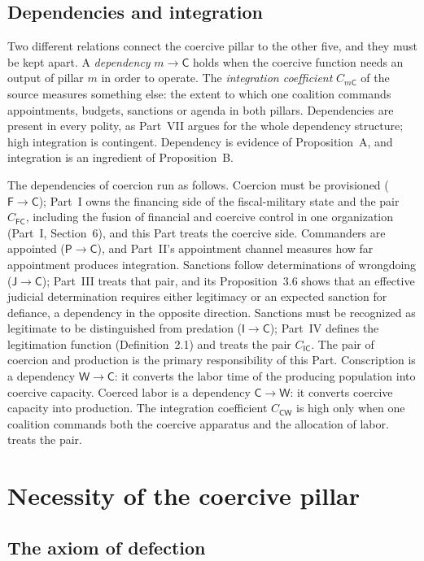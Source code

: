 \documentclass[11pt,letterpaper]{article}
\theoremstyle{definition}
\theoremstyle{remark}
\newcommand{\pF}{\mathsf{F}}
\newcommand{\pP}{\mathsf{P}}
\newcommand{\pJ}{\mathsf{J}}
\newcommand{\pI}{\mathsf{I}}
\newcommand{\pC}{\mathsf{C}}
\newcommand{\pW}{\mathsf{W}}
\begin{document}
\subsection{Dependencies and integration}
\label{sec:depint}

Two different relations connect the coercive pillar to the other five, and they must be kept apart. A \emph{dependency} $m \to \pC$ holds when the coercive function needs an output of pillar $m$ in order to operate. The \emph{integration coefficient} $C_{m\pC}$ of the source measures something else: the extent to which one coalition commands appointments, budgets, sanctions or agenda in both pillars. Dependencies are present in every polity, as Part~VII argues for the whole dependency structure; high integration is contingent. Dependency is evidence of Proposition~A, and integration is an ingredient of Proposition~B.

The dependencies of coercion run as follows. Coercion must be provisioned ($\pF \to \pC$); Part~I owns the financing side of the fiscal-military state and the pair $C_{\pF\pC}$, including the fusion of financial and coercive control in one organization (Part~I, Section~6), and this Part treats the coercive side. Commanders are appointed ($\pP \to \pC$), and Part~II's appointment channel measures how far appointment produces integration. Sanctions follow determinations of wrongdoing ($\pJ \to \pC$); Part~III treats that pair, and its Proposition~3.6 shows that an effective judicial determination requires either legitimacy or an expected sanction for defiance, a dependency in the opposite direction. Sanctions must be recognized as legitimate to be distinguished from predation ($\pI \to \pC$); Part~IV defines the legitimation function (Definition~2.1) and treats the pair $C_{\pI\pC}$. The pair of coercion and production is the primary responsibility of this Part. Conscription is a dependency $\pW \to \pC$: it converts the labor time of the producing population into coercive capacity. Coerced labor is a dependency $\pC \to \pW$: it converts coercive capacity into production. The integration coefficient $C_{\pC\pW}$ is high only when one coalition commands both the coercive apparatus and the allocation of labor.  treats the pair.

\section{Necessity of the coercive pillar}
\label{sec:necessity}

\subsection{The axiom of defection}
\end{document}
